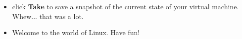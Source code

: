 \documentclass[12pt]{article}
\begin{document}
\begin{description}
\begin{description}
\begin{enumerate}
\begin{itemize}
     		\item click {\bf Take} to save a snapshot of the current state of your virtual machine. Whew... that was a lot. 
     		\item Welcome to the world of Linux. Have fun!
    		\end{itemize}
\end{enumerate}

\end{description}    
\end{description}
\end{document}
